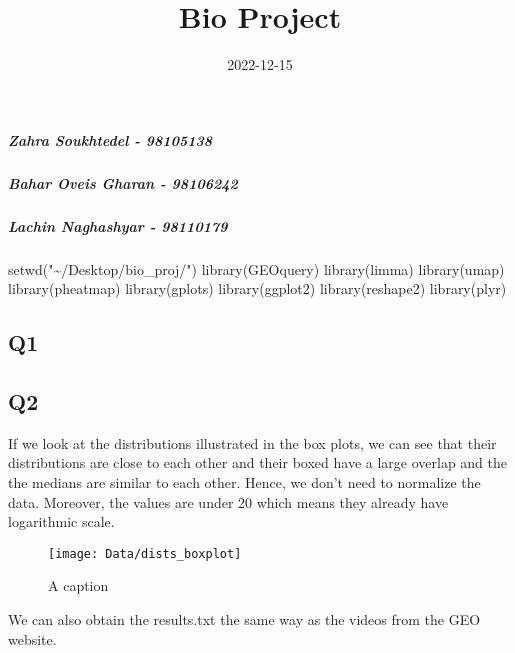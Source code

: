 \documentclass[
]{article}
\title{Bio Project}
\author{}
\date{\vspace{-2.5em}2022-12-15}
\newenvironment{Shaded}{\begin{snugshade}}{\end{snugshade}}
\newcommand{\FunctionTok}[1]{\textcolor[rgb]{0.00,0.00,0.00}{#1}}
\newcommand{\NormalTok}[1]{#1}
\newcommand{\StringTok}[1]{\textcolor[rgb]{0.31,0.60,0.02}{#1}}
\begin{document}
\maketitle

\hypertarget{zahra-soukhtedel---98105138}{%
\subparagraph{Zahra Soukhtedel -
98105138}\label{zahra-soukhtedel---98105138}}

\hypertarget{bahar-oveis-gharan---98106242}{%
\subparagraph{Bahar Oveis Gharan -
98106242}\label{bahar-oveis-gharan---98106242}}

\hypertarget{lachin-naghashyar---98110179}{%
\subparagraph{Lachin Naghashyar -
98110179}\label{lachin-naghashyar---98110179}}

\begin{Shaded}
\begin{Highlighting}[]
\FunctionTok{setwd}\NormalTok{(}\StringTok{"\textasciitilde{}/Desktop/bio\_proj/"}\NormalTok{)}
\FunctionTok{library}\NormalTok{(GEOquery)}
\FunctionTok{library}\NormalTok{(limma)}
\FunctionTok{library}\NormalTok{(umap)}
\FunctionTok{library}\NormalTok{(pheatmap)}
\FunctionTok{library}\NormalTok{(gplots)}
\FunctionTok{library}\NormalTok{(ggplot2)}
\FunctionTok{library}\NormalTok{(reshape2)}
\FunctionTok{library}\NormalTok{(plyr)}
\end{Highlighting}
\end{Shaded}

\hypertarget{q1}{%
\subsection{Q1}\label{q1}}

\hypertarget{q2}{%
\subsection{Q2}\label{q2}}

If we look at the distributions illustrated in the box plots, we can see
that their distributions are close to each other and their boxed have a
large overlap and the the medians are similar to each other. Hence, we
don't need to normalize the data. Moreover, the values are under 20
which means they already have logarithmic scale.

\begin{figure}
\texttt{[image: Data/dists\_boxplot]} \caption{A caption}\label{fig:pressure}
\end{figure}

We can also obtain the results.txt the same way as the videos from the
GEO website.
\end{document}
